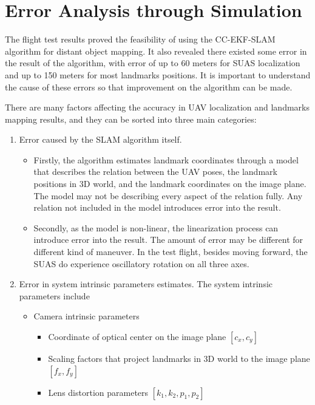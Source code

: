 \chapter{Error Analysis through Simulation}\label{ch:simulation}
The flight test results proved the feasibility of using the CC-EKF-SLAM
algorithm for distant object mapping. It also revealed there existed
some error in the result of the algorithm, with error of up to 60
meters for SUAS localization and up to 150 meters for most landmarks
positions. It is important to understand the cause of these errors so
that improvement on the algorithm can be made.

There are many factors affecting the accuracy in UAV localization and
landmarks mapping results, and they can be sorted into three main
categories:

\begin{enumerate}
  \item Error caused by the SLAM algorithm itself. 
  \begin{itemize}
    \item Firstly, the algorithm estimates landmark coordinates
    through a model that describes the relation between the UAV poses,
    the landmark positions in 3D world, and the landmark coordinates on
    the image plane. The model may not be describing every aspect of
    the relation fully. Any relation not included in the model introduces
    error into the result.
    \item Secondly, as the model is non-linear, the linearization
    process can introduce error into the result. The amount of error
    may be different for different kind of maneuver. In the test
    flight, besides moving forward, the SUAS do experience oscillatory
    rotation on all three axes.
  \end{itemize}
  \item Error in system intrinsic parameters estimates. The system
  intrinsic parameters include
  \begin{itemize}
    \item Camera intrinsic parameters
    \begin{itemize}
      \item Coordinate of optical center on the image plane $[c_{x}, c_{y}]$
      \item Scaling factors that project landmarks in 3D world to the image plane $ [f_{x}, f_{y}]$
      \item Lens distortion parameters $[k_{1}, k_{2}, p_{1}, p_{2}]$
    \end{itemize}

\end{itemize}
\end{enumerate}
